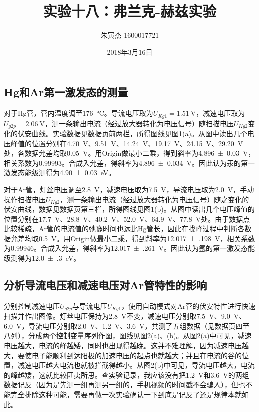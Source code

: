\documentclass[UTF8]{ctexart}
\title{实验十八：弗兰克-赫兹实验}
\author{朱寅杰 1600017721}
\date{2018年3月16日}
\begin{document}
\maketitle
\setcounter{section}{18}
\subsection{Hg和Ar第一激发态的测量}
对于Hg管，管内温度调至\SI{176}{\degreeCelsius}。导流电压取为$U_{Kg1}=\SI{1.51}{\V}$，减速电压取为$U_{g2p}=\SI{2.06}{\V}$，测一条输出电流（经过放大器转化为电压信号）随扫描电压$U_{Kg2}$变化的伏安曲线。实验数据见数据页前两栏，所得图线见图1(a)。从图中读出几个电压峰值的位置分别在\SI{4.70}{\V}、\SI{9.51}{\V}、\SI{14.24}{\V}、\SI{19.17}{\V}、\SI{24.15}{\V}、\SI{29.20}{\V}处，各数据允差均取\SI{.05}{\V}。用Origin做最小二乘，得到斜率为\SI{4.896(30)}{\V}，相关系数为\num{.99993}。合成入允差，得斜率为\SI{4.896(34)}{\V}。因此认为汞的第一激发态能级测得为\SI{4.90(3)}{\eV}。

对于Ar管，灯丝电压调至\SI{2.8}{\V}，减速电压取为\SI{7.5}{\V}，导流电压取为\SI{2.0}{\V}，手动操作扫描电压$U_{Kg2}$，测一条输出电流（经过放大器转化为电压信号）随之变化的伏安曲线，数据见数据页第三栏，所得图线见图1(b)。从图中读出几个电压峰值的位置分别在\SI{17.7} {\V}、\SI{28.8}{\V}、\SI{40.2}{\V}、\SI{52.0}{\V}、\SI{64.9}{\V}、\SI{77.8}{\V}处。由于数据点比较稀疏，Ar管的电流值的弛豫时间也远比Hg管长，因此在找峰过程中判断各数据允差均取\SI{.5}{\V}。用Origin做最小二乘，得到斜率为\SI{12.017(198)}{\V}，相关系数为\num{.99946}。合成入允差，得斜率为\SI{12.017(261)}{\V}。因此认为氩的第一激发态能级测得为\SI{12.0(3)}{\eV}。

\subsection{分析导流电压和减速电压对Ar管特性的影响}
分别控制减速电压$U_{g2p}$与导流电压$U_{Kg1}$，使用自动模式对Ar管的伏安特性进行快速扫描并作出图像。灯丝电压保持为\SI{2.8}{\V}不变，减速电压分别取\SI{7.5}{\V}、\SI{9.0}{\V}、\SI{6.0}{\V}，导流电压分别取\SI{2.0}{\V}、\SI{1.2}{\V}、\SI{3.6}{\V}，共测了五组数据（见数据页四至八列），分成两个控制变量序列作图，图线见图2(a)、(b)。从图2(a)中可见，减速电压越大，电流的峰越矮，同时也出现得越晚。这并不难理解，因为减速电压越大，要使电子能顺利到达阳极的加速电压的起点也就越大；并且在电流的谷的位置，减速电压越大电流也就被拦截得越小。从图2(b)中可见，导流电压越大，电流的峰越矮，这就比较匪夷所思。查实验记录，我应该没有把\SI{1.2}{\V}和\SI{3.6}{\V}的两组数据记反（因为是先测一组再测另一组的，手机视频的时间戳不会骗人），但也不能完全排除这种可能，需要再做一次实验确认一下到底是记反了还是规律本就如此。
\end{document}
